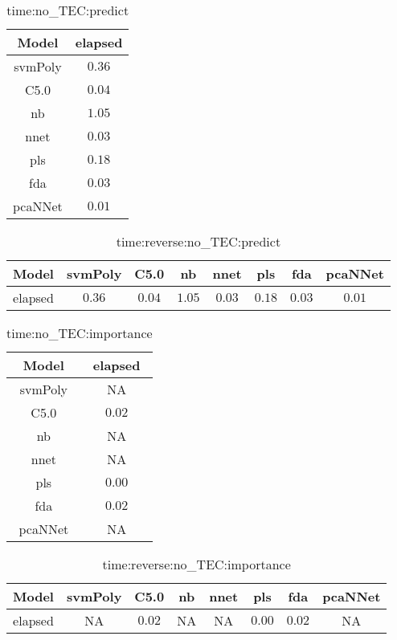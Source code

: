 \begin{table}[!ht]
	\centering
	\begin{tabular}{|c|c|}
		\hline
		Model & elapsed \\ \hline
		svmPoly & $0.36$ \\ \hline
		C5.0 & $0.04$ \\ \hline
		nb & $1.05$ \\ \hline
		nnet & $0.03$ \\ \hline
		pls & $0.18$ \\ \hline
		fda & $0.03$ \\ \hline
		pcaNNet & $0.01$ \\ \hline
	\end{tabular}
	\caption{time:no_TEC:predict}
	\label{tab:time:no_TEC:predict}
\end{table}

\begin{table}[!ht]
	\centering
	\begin{tabular}{|c|c|c|c|c|c|c|c|}
		\hline
		Model & svmPoly & C5.0 & nb & nnet & pls & fda & pcaNNet \\ \hline
		elapsed & $0.36$ & $0.04$ & $1.05$ & $0.03$ & $0.18$ & $0.03$ & $0.01$ \\ \hline
	\end{tabular}
	\caption{time:reverse:no_TEC:predict}
	\label{tab:time:reverse:no_TEC:predict}
\end{table}

\begin{table}[!ht]
	\centering
	\begin{tabular}{|c|c|}
		\hline
		Model & elapsed \\ \hline
		svmPoly & NA \\ \hline
		C5.0 & $0.02$ \\ \hline
		nb & NA \\ \hline
		nnet & NA \\ \hline
		pls & $0.00$ \\ \hline
		fda & $0.02$ \\ \hline
		pcaNNet & NA \\ \hline
	\end{tabular}
	\caption{time:no_TEC:importance}
	\label{tab:time:no_TEC:importance}
\end{table}

\begin{table}[!ht]
	\centering
	\begin{tabular}{|c|c|c|c|c|c|c|c|}
		\hline
		Model & svmPoly & C5.0 & nb & nnet & pls & fda & pcaNNet \\ \hline
		elapsed & NA & $0.02$ & NA & NA & $0.00$ & $0.02$ & NA \\ \hline
	\end{tabular}
	\caption{time:reverse:no_TEC:importance}
	\label{tab:time:reverse:no_TEC:importance}
\end{table}

